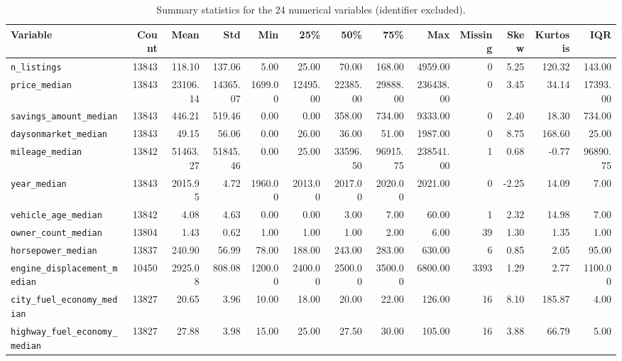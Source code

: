 \begin{table}[htbp]
  \centering
  \caption{Summary statistics for the 24 numerical variables (identifier excluded).}
  \label{tab:stats}
  \scriptsize
  \renewcommand{\arraystretch}{0.92}
  \setlength{\tabcolsep}{3.5pt}
  \begin{tabular}{lrrrrrrrrrrrr}
    \toprule
    \textbf{Variable} & \textbf{Count} & \textbf{Mean} & \textbf{Std} & \textbf{Min} & \textbf{25\%} & \textbf{50\%} & \textbf{75\%} & \textbf{Max} & \textbf{Missing} & \textbf{Skew} & \textbf{Kurtosis} & \textbf{IQR} \\
    \midrule
    \texttt{n\_listings} & 13843 & 118.10 & 137.06 & 5.00 & 25.00 & 70.00 & 168.00 & 4959.00 & 0 & 5.25 & 120.32 & 143.00 \\
    \texttt{price\_median} & 13843 & 23106.14 & 14365.07 & 1699.00 & 12495.00 & 22385.00 & 29888.00 & 236438.00 & 0 & 3.45 & 34.14 & 17393.00 \\
    \texttt{savings\_amount\_median} & 13843 & 446.21 & 519.46 & 0.00 & 0.00 & 358.00 & 734.00 & 9333.00 & 0 & 2.40 & 18.30 & 734.00 \\
    \texttt{daysonmarket\_median} & 13843 & 49.15 & 56.06 & 0.00 & 26.00 & 36.00 & 51.00 & 1987.00 & 0 & 8.75 & 168.60 & 25.00 \\
    \texttt{mileage\_median} & 13842 & 51463.27 & 51845.46 & 0.00 & 25.00 & 33596.50 & 96915.75 & 238541.00 & 1 & 0.68 & -0.77 & 96890.75 \\
    \texttt{year\_median} & 13843 & 2015.95 & 4.72 & 1960.00 & 2013.00 & 2017.00 & 2020.00 & 2021.00 & 0 & -2.25 & 14.09 & 7.00 \\
    \texttt{vehicle\_age\_median} & 13842 & 4.08 & 4.63 & 0.00 & 0.00 & 3.00 & 7.00 & 60.00 & 1 & 2.32 & 14.98 & 7.00 \\
    \texttt{owner\_count\_median} & 13804 & 1.43 & 0.62 & 1.00 & 1.00 & 1.00 & 2.00 & 6.00 & 39 & 1.30 & 1.35 & 1.00 \\
    \texttt{horsepower\_median} & 13837 & 240.90 & 56.99 & 78.00 & 188.00 & 243.00 & 283.00 & 630.00 & 6 & 0.85 & 2.05 & 95.00 \\
    \texttt{engine\_displacement\_median} & 10450 & 2925.08 & 808.08 & 1200.00 & 2400.00 & 2500.00 & 3500.00 & 6800.00 & 3393 & 1.29 & 2.77 & 1100.00 \\
    \texttt{city\_fuel\_economy\_median} & 13827 & 20.65 & 3.96 & 10.00 & 18.00 & 20.00 & 22.00 & 126.00 & 16 & 8.10 & 185.87 & 4.00 \\
    \texttt{highway\_fuel\_economy\_median} & 13827 & 27.88 & 3.98 & 15.00 & 25.00 & 27.50 & 30.00 & 105.00 & 16 & 3.88 & 66.79 & 5.00 \\

\end{tabular}
\end{table}
